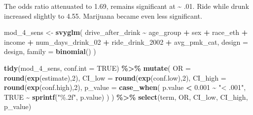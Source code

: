 \documentclass[
]{article}
\newenvironment{Shaded}{\begin{snugshade}}{\end{snugshade}}
\newcommand{\AttributeTok}[1]{\textcolor[rgb]{0.13,0.29,0.53}{#1}}
\newcommand{\ConstantTok}[1]{\textcolor[rgb]{0.56,0.35,0.01}{#1}}
\newcommand{\DecValTok}[1]{\textcolor[rgb]{0.00,0.00,0.81}{#1}}
\newcommand{\FloatTok}[1]{\textcolor[rgb]{0.00,0.00,0.81}{#1}}
\newcommand{\FunctionTok}[1]{\textcolor[rgb]{0.13,0.29,0.53}{\textbf{#1}}}
\newcommand{\NormalTok}[1]{#1}
\newcommand{\OtherTok}[1]{\textcolor[rgb]{0.56,0.35,0.01}{#1}}
\newcommand{\SpecialCharTok}[1]{\textcolor[rgb]{0.81,0.36,0.00}{\textbf{#1}}}
\newcommand{\StringTok}[1]{\textcolor[rgb]{0.31,0.60,0.02}{#1}}
\begin{document}
The odds ratio attenuated to 1.69, remains significant at
\textasciitilde{} .01. Ride while drunk increased slightly to 4.55.
Marijuana became even less significant.

\begin{Shaded}
\begin{Highlighting}[]
\NormalTok{mod\_4\_sens }\OtherTok{\textless{}{-}} \FunctionTok{svyglm}\NormalTok{(}
\NormalTok{  drive\_after\_drink }\SpecialCharTok{\textasciitilde{}}\NormalTok{ age\_group }\SpecialCharTok{+}\NormalTok{ sex }\SpecialCharTok{+}\NormalTok{ race\_eth }\SpecialCharTok{+}\NormalTok{ income }\SpecialCharTok{+} 
\NormalTok{     num\_days\_drink\_02 }\SpecialCharTok{+}\NormalTok{ ride\_drink\_2002 }\SpecialCharTok{+}\NormalTok{ avg\_pmk\_cat,}
  \AttributeTok{design =}\NormalTok{ design,}
  \AttributeTok{family =} \FunctionTok{binomial}\NormalTok{()}
\NormalTok{) }

\FunctionTok{tidy}\NormalTok{(mod\_4\_sens, }\AttributeTok{conf.int =} \ConstantTok{TRUE}\NormalTok{) }\SpecialCharTok{\%\textgreater{}\%}
  \FunctionTok{mutate}\NormalTok{(}
    \AttributeTok{OR =} \FunctionTok{round}\NormalTok{(}\FunctionTok{exp}\NormalTok{(estimate),}\DecValTok{2}\NormalTok{),}
    \AttributeTok{CI\_low =} \FunctionTok{round}\NormalTok{(}\FunctionTok{exp}\NormalTok{(conf.low),}\DecValTok{2}\NormalTok{),}
    \AttributeTok{CI\_high =} \FunctionTok{round}\NormalTok{(}\FunctionTok{exp}\NormalTok{(conf.high),}\DecValTok{2}\NormalTok{),}
    \AttributeTok{p\_value =} \FunctionTok{case\_when}\NormalTok{(}
\NormalTok{      p.value }\SpecialCharTok{\textless{}} \FloatTok{0.001} \SpecialCharTok{\textasciitilde{}} \StringTok{"\textless{} .001"}\NormalTok{,}
      \ConstantTok{TRUE} \SpecialCharTok{\textasciitilde{}} \FunctionTok{sprintf}\NormalTok{(}\StringTok{"\%.2f"}\NormalTok{, p.value)}
\NormalTok{    )}
\NormalTok{  ) }\SpecialCharTok{\%\textgreater{}\%}
  \FunctionTok{select}\NormalTok{(term, OR, CI\_low, CI\_high, p\_value)}
\end{Highlighting}
\end{Shaded}
\end{document}
